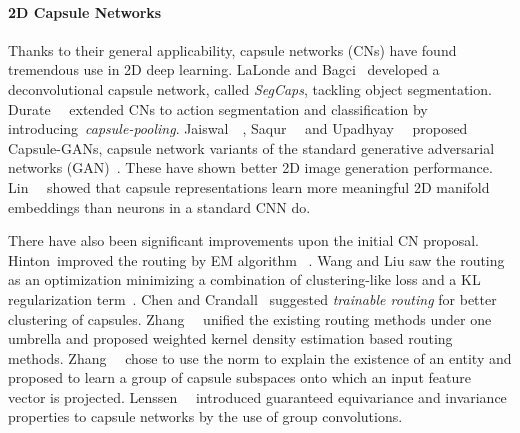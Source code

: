 \documentclass[10pt,twocolumn,letterpaper]{article}
\theoremstyle{break}
\begin{document}
\vspace{-1.5mm}\paragraph{2D Capsule Networks}
Thanks to their general applicability, capsule networks (CNs) have found tremendous use in 2D deep learning. 
LaLonde and Bagci~\cite{lalonde2018capsules} developed a deconvolutional capsule network, called \textit{SegCaps}, tackling object segmentation.
Durate~\etal~\cite{duarte2018videocapsulenet} extended CNs to action segmentation and classification by introducing~\textit{capsule-pooling}.
Jaiswal~\etal~\cite{jaiswal2018capsulegan}, Saqur~\etal~\cite{saqur2018capsgan} and Upadhyay~\etal~\cite{upadhyay2018generative} proposed Capsule-GANs, \ie capsule network variants of the standard generative adversarial networks (GAN)~\cite{goodfellow2014generative}. These have shown better 2D image generation performance. Lin~\etal~\cite{lin2018learning} showed that capsule representations learn more meaningful 2D manifold embeddings than neurons in a standard CNN do.

There have also been significant improvements upon the initial CN proposal. Hinton~\etal improved the routing by EM algorithm ~\cite{hinton2018matrix}. 
Wang and Liu saw the routing as an optimization minimizing a combination
of clustering-like loss and a KL regularization term~\cite{wang2018optimization}. 
Chen and Crandall~\cite{chen2018generalized} suggested \textit{trainable routing} for better clustering of capsules.
Zhang~\etal~\cite{zhang2018fast} unified the existing routing methods under one umbrella and proposed weighted kernel density estimation based routing methods.
Zhang~\etal~\cite{zhang2018cappronet} chose to use the norm to explain the existence of an entity and proposed to learn a group of capsule subspaces onto which an input feature vector is projected. 
Lenssen~\etal~\cite{lenssen2018group} introduced guaranteed equivariance and invariance properties to capsule networks by the use of group convolutions. 
\end{document}

